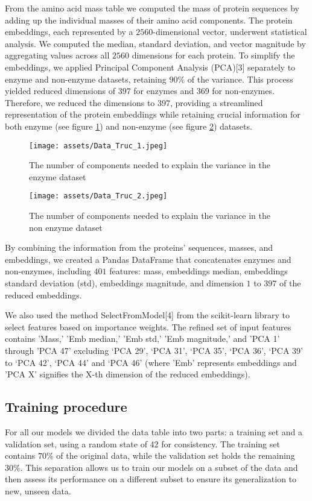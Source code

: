 \documentclass{bioinfo}
\begin{document}
\begin{methods}
From the amino acid mass table we computed the mass of protein sequences by adding up the individual masses of their amino acid components.
The protein embeddings, each represented by a $2560$-dimensional vector, underwent statistical analysis.
We computed the median, standard deviation, and vector magnitude by aggregating values across all $2560$ dimensions for each protein.
To simplify the embeddings, we applied Principal Component Analysis (PCA)[3] %
separately to enzyme and non-enzyme datasets,
retaining $90\%$ of the variance. This process yielded reduced dimensions of $397$ for enzymes and $369$ for non-enzymes. 
Therefore, we reduced the dimensions to $397$, providing a streamlined representation of the protein embeddings while retaining crucial information for both 
enzyme (see figure \ref{fig:01}) and non-enzyme (see figure \ref{fig:02}) datasets.

\begin{figure}[!thbp]
\texttt{[image: assets/Data\_Truc\_1.jpeg]}
\caption{The number of components needed to explain the variance in the enzyme dataset}\label{fig:01}
\end{figure}

\begin{figure}[!thbp]
\texttt{[image: assets/Data\_Truc\_2.jpeg]}
\caption{The number of components needed to explain the variance in the non enzyme dataset}\label{fig:02}
\end{figure}


By combining the information from the proteins’ sequences, masses, and embeddings, we created a Pandas DataFrame that concatenates enzymes and non-enzymes,
including $401$ features: mass, embeddings median, embeddings standard deviation (std), embeddings magnitude, and dimension $1$ to $397$ of the reduced 
embeddings. 

We also used the method SelectFromModel[4] from the scikit-learn library %
to select features based on importance weights. The refined set of input features contains 
'Mass,' 'Emb median,' 'Emb std,' 'Emb magnitude,' and 'PCA 1' through 'PCA 47' excluding ‘PCA 29’, ‘PCA 31’, ‘PCA 35’, 
‘PCA 36’, ‘PCA 39’ to ‘PCA 42’, ‘PCA 44’ and ‘PCA 46’ (where 'Emb' represents embeddings and 'PCA X' signifies the X-th dimension of the reduced embeddings).


\subsection{Training procedure}
For all our models we divided the data table into two parts: a training set and a validation set, using a random state of 42 for consistency. 
The training set contains $70\%$ of the original data, while the validation set holds the remaining $30\%$. 
This separation allows us to train our models on a subset of the data and then assess its performance on a different subset to ensure its generalization to new, unseen data.


\end{methods}
\end{document}

